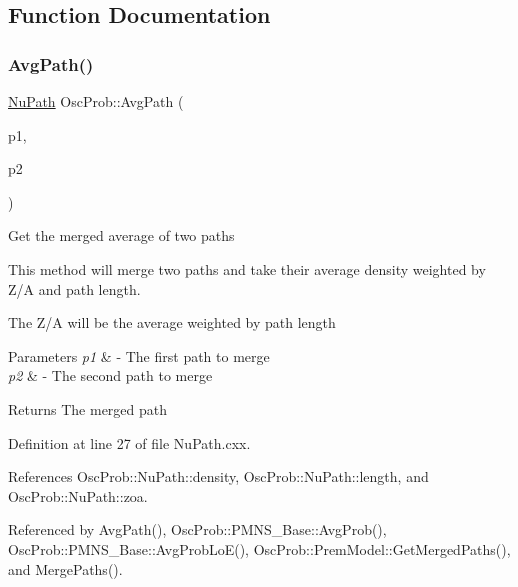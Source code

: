 \subsection{Function Documentation}
\mbox{\label{namespaceOscProb_a999a7944bad8bc72d7ee9f56f81a210e}} 
\subsubsection{\texorpdfstring{Avg\+Path()}{AvgPath()}\hspace{0.1cm}{\footnotesize\ttfamily [1/2]}}
{\footnotesize\ttfamily \hyperlink{structOscProb_1_1NuPath}{Nu\+Path} Osc\+Prob\+::\+Avg\+Path (\begin{DoxyParamCaption}\item[{\hyperlink{structOscProb_1_1NuPath}{Osc\+Prob\+::\+Nu\+Path} \&}]{p1,  }\item[{\hyperlink{structOscProb_1_1NuPath}{Osc\+Prob\+::\+Nu\+Path} \&}]{p2 }\end{DoxyParamCaption})}

Get the merged average of two paths

This method will merge two paths and take their average density weighted by Z/A and path length.

The Z/A will be the average weighted by path length


\begin{DoxyParams}{Parameters}
{\em p1} & -\/ The first path to merge \\
\hline
{\em p2} & -\/ The second path to merge \\
\hline
\end{DoxyParams}
\begin{DoxyReturn}{Returns}
The merged path 
\end{DoxyReturn}


Definition at line 27 of file Nu\+Path.\+cxx.



References Osc\+Prob\+::\+Nu\+Path\+::density, Osc\+Prob\+::\+Nu\+Path\+::length, and Osc\+Prob\+::\+Nu\+Path\+::zoa.



Referenced by Avg\+Path(), Osc\+Prob\+::\+P\+M\+N\+S\+\_\+\+Base\+::\+Avg\+Prob(), Osc\+Prob\+::\+P\+M\+N\+S\+\_\+\+Base\+::\+Avg\+Prob\+Lo\+E(), Osc\+Prob\+::\+Prem\+Model\+::\+Get\+Merged\+Paths(), and Merge\+Paths().


